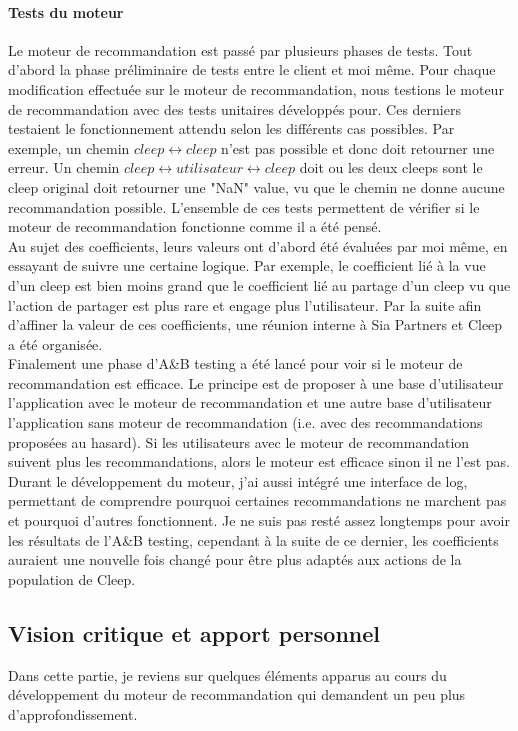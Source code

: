 \documentclass{article} %
\begin{document}
\paragraph{Tests du moteur\\}
Le moteur de recommandation est passé par plusieurs phases de tests. Tout d'abord la phase préliminaire de tests entre le client et moi même. Pour chaque modification effectuée sur le moteur de recommandation, nous testions le moteur de recommandation avec des tests unitaires développés pour. Ces derniers testaient le fonctionnement attendu selon les différents cas possibles. Par exemple, un chemin $cleep \leftrightarrow cleep$ n'est pas possible et donc doit retourner une erreur. Un chemin $cleep \leftrightarrow utilisateur \leftrightarrow cleep$ doit ou les deux cleeps sont le cleep original doit retourner une "NaN" value, vu que le chemin ne donne aucune recommandation possible. L'ensemble de ces tests permettent de vérifier si le moteur de recommandation fonctionne comme il a été pensé.\\
Au sujet des coefficients, leurs valeurs ont d'abord été évaluées par moi même, en essayant de suivre une certaine logique. Par exemple, le coefficient lié à la vue d'un cleep est bien moins grand que le coefficient lié au partage d'un cleep vu que l'action de partager est plus rare et engage plus l'utilisateur. Par la suite afin d'affiner la valeur de ces coefficients, une réunion interne à Sia Partners et Cleep a été organisée.\\
Finalement une phase d'A\&B testing a été lancé pour voir si le moteur de recommandation est efficace. Le principe est de proposer à une base d'utilisateur l'application avec le moteur de recommandation et une autre base d'utilisateur l'application sans moteur de recommandation (i.e. avec des recommandations proposées au hasard). Si les utilisateurs avec le moteur de recommandation suivent plus les recommandations, alors le moteur est efficace sinon il ne l'est pas. Durant le développement du moteur, j'ai aussi intégré une interface de log, permettant de comprendre pourquoi certaines recommandations ne marchent pas et pourquoi d'autres fonctionnent. Je ne suis pas resté assez longtemps pour avoir les résultats de l'A\&B testing, cependant à la suite de ce dernier, les coefficients auraient une nouvelle fois changé pour être plus adaptés aux actions de la population de Cleep.

\subsection{Vision critique et apport personnel}
Dans cette partie, je reviens sur quelques éléments apparus au cours du développement du moteur de recommandation qui demandent un peu plus d'approfondissement.
\end{document}
